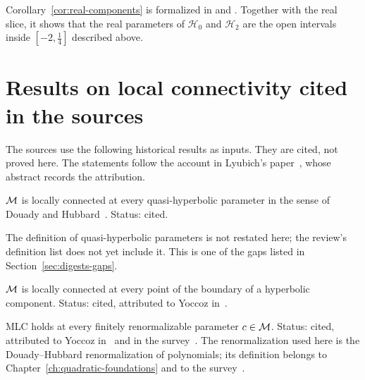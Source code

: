 \begin{remark}
Corollary~\ref{cor:real-components} is formalized in
 and
.
Together with the real slice, it shows that the real parameters of $\mathcal H_0$ and $\mathcal H_2$ are the open intervals
inside $[-2,\tfrac14]$ described above.
\end{remark}

\section{Results on local connectivity cited in the sources}

The sources use the following historical results as inputs.  They are cited,
not proved here.  The statements follow the account in Lyubich's
paper~\cite{LyubichGeometry}, whose abstract records the attribution.

\begin{theorem}
\label{thm:dh-quasihyperbolic}
$\mathcal M$ is locally connected at every quasi-hyperbolic parameter in the sense of
Douady and Hubbard~\cite{DH}.  Status: cited.
\end{theorem}

\begin{remark}
The definition of quasi-hyperbolic parameters is not restated here; the
review's definition list does not yet include it.  This is one of the gaps listed
in Section~\ref{sec:digests-gaps}.
\end{remark}

\begin{theorem}
\label{thm:yoccoz-hyperbolic-boundary}
$\mathcal M$ is locally connected at every point of the boundary of a hyperbolic
component.  Status: cited, attributed to Yoccoz in~\cite{LyubichGeometry}.
\end{theorem}

\begin{theorem}
\label{thm:yoccoz-finite-renormalization}
MLC holds at every finitely renormalizable parameter $c\in\mathcal M$.  Status: cited,
attributed to Yoccoz in~\cite{LyubichGeometry} and in the survey~\cite{DudkoMLC}.
The renormalization used here is the Douady--Hubbard renormalization of
polynomials; its definition belongs to Chapter~\ref{ch:quadratic-foundations} and to the
survey~\cite{DudkoMLC}.
\end{theorem}

